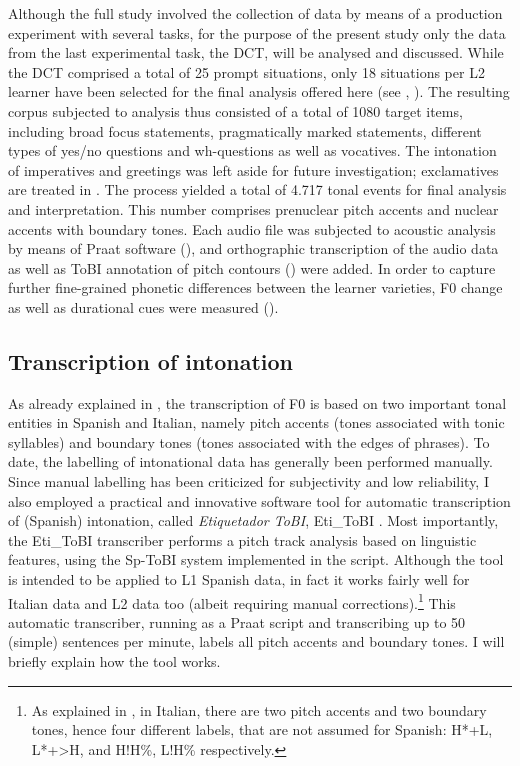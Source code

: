 Although the full study involved the collection of data by means of a production experiment with several tasks, for the purpose of the present study only the data from the last experimental task, the DCT, will be analysed and discussed. While the DCT comprised a total of 25 prompt situations, only 18 situations per L2 learner have been selected for the final analysis offered here (see , \textit{}). The resulting corpus subjected to analysis thus consisted of a total of 1080 target items, including broad focus statements, pragmatically marked statements, different types of yes/no questions and wh-questions as well as vocatives. The intonation of imperatives and greetings was left aside for future investigation; exclamatives are treated in \citet{Pešková2022b}. The process yielded a total of 4.717 tonal events for final analysis and interpretation. This number comprises prenuclear pitch accents and nuclear accents with boundary tones. Each audio file was subjected to acoustic analysis by means of Praat software (\citealt{BoersmaWeenink1992-2019}), and orthographic transcription of the audio data as well as ToBI annotation of pitch contours () were added. In order to capture further fine-grained phonetic differences between the learner varieties, F0 change as well as durational cues were measured ().


\subsection{Transcription of intonation}\label{sec:3.4.1}\largerpage

As already explained in , the transcription of F0 is based on two important tonal entities in Spanish and Italian, namely pitch accents (tones associated with tonic syllables) and boundary tones (tones associated with the edges of phrases). To date, the labelling of intonational data has generally been performed manually. Since manual labelling has been criticized for subjectivity and low reliability, I also employed a practical and innovative software tool for automatic transcription of (Spanish) intonation, called \textit{Etiquetador ToBI}, Eti\_ToBI \citep{Elvira-GarcíaEtAl2016}. Most importantly, the Eti\_ToBI transcriber performs a pitch track analysis based on linguistic features, using the Sp-ToBI system implemented in the script. Although the tool is intended to be applied to L1 Spanish data, in fact it works fairly well for Italian data and L2 data too (albeit requiring manual corrections).\footnote{As explained in , in Italian, there are two pitch accents and two boundary tones, hence four different labels, that are not assumed for Spanish: H*+L, L*+>H, and H!H\%, L!H\% respectively.} This automatic transcriber, running as a Praat script and transcribing up to 50 (simple) sentences per minute, labels all pitch accents and boundary tones. I will briefly explain how the tool works.



